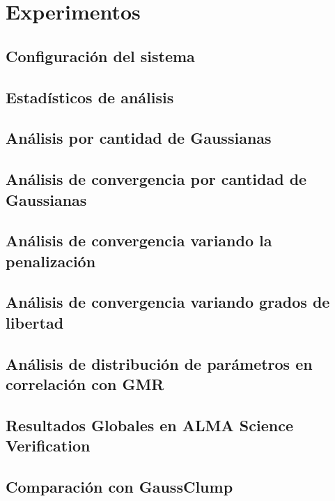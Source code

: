 \chapter{Experimentos}


\section{Configuración del sistema}


\section{Estadísticos de análisis}


\section{Análisis por cantidad de Gaussianas}


\section{Análisis de convergencia por cantidad de Gaussianas}


\section{Análisis de convergencia variando la penalización}


\section{Análisis de convergencia variando grados de libertad}


\section{Análisis de distribución de parámetros en correlación con GMR}


\section{Resultados Globales en ALMA Science Verification}


\section{Comparación con GaussClump}









